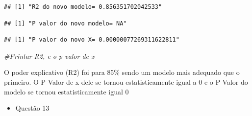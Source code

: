 \documentclass[
]{article}
\newenvironment{Shaded}{\begin{snugshade}}{\end{snugshade}}
\newcommand{\CommentTok}[1]{\textcolor[rgb]{0.56,0.35,0.01}{\textit{#1}}}
\newcommand{\DecValTok}[1]{\textcolor[rgb]{0.00,0.00,0.81}{#1}}
\newcommand{\FunctionTok}[1]{\textcolor[rgb]{0.00,0.00,0.00}{#1}}
\newcommand{\NormalTok}[1]{#1}
\newcommand{\OtherTok}[1]{\textcolor[rgb]{0.56,0.35,0.01}{#1}}
\newcommand{\SpecialCharTok}[1]{\textcolor[rgb]{0.00,0.00,0.00}{#1}}
\newcommand{\StringTok}[1]{\textcolor[rgb]{0.31,0.60,0.02}{#1}}
\providecommand{\tightlist}{%
  \setlength{\itemsep}{0pt}\setlength{\parskip}{0pt}}
\begin{document}
\begin{Shaded}
\end{Shaded}

\begin{verbatim}
## [1] "R2 do novo modelo= 0.856351702042533"
\end{verbatim}

\begin{Shaded}
\end{Shaded}

\begin{verbatim}
## [1] "P valor do novo modelo= NA"
\end{verbatim}

\begin{Shaded}
\end{Shaded}

\begin{verbatim}
## [1] "P valor do novo X= 0.00000077269311622811"
\end{verbatim}

\begin{Shaded}
\begin{Highlighting}[]
\CommentTok{\#Printar R2, e o p valor de x}
\end{Highlighting}
\end{Shaded}

O poder explicativo (R2) foi para 85\% sendo um modelo mais adequado que
o primeiro. O P Valor de x dele se tornou estatisticamente igual a 0 e o
P Valor do modelo se tornou estatisticamente igual 0

\begin{itemize}
\tightlist
\item
  Questão 13
\end{itemize}
\end{document}
